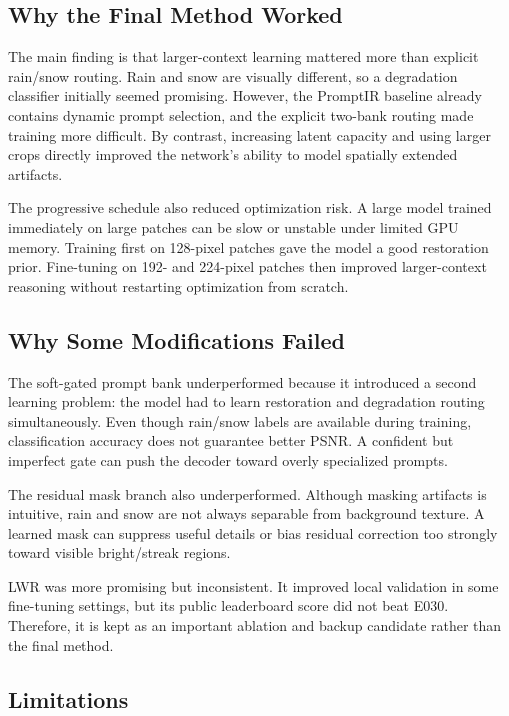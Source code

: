 \documentclass[10pt,conference]{article}
\begin{document}
\subsection{Why the Final Method Worked}

The main finding is that larger-context learning mattered more than explicit rain/snow routing. Rain and snow are visually different, so a degradation classifier initially seemed promising. However, the PromptIR baseline already contains dynamic prompt selection, and the explicit two-bank routing made training more difficult. By contrast, increasing latent capacity and using larger crops directly improved the network's ability to model spatially extended artifacts.

The progressive schedule also reduced optimization risk. A large model trained immediately on large patches can be slow or unstable under limited GPU memory. Training first on 128-pixel patches gave the model a good restoration prior. Fine-tuning on 192- and 224-pixel patches then improved larger-context reasoning without restarting optimization from scratch.

\subsection{Why Some Modifications Failed}

The soft-gated prompt bank underperformed because it introduced a second learning problem: the model had to learn restoration and degradation routing simultaneously. Even though rain/snow labels are available during training, classification accuracy does not guarantee better PSNR. A confident but imperfect gate can push the decoder toward overly specialized prompts.

The residual mask branch also underperformed. Although masking artifacts is intuitive, rain and snow are not always separable from background texture. A learned mask can suppress useful details or bias residual correction too strongly toward visible bright/streak regions.

LWR was more promising but inconsistent. It improved local validation in some fine-tuning settings, but its public leaderboard score did not beat E030. Therefore, it is kept as an important ablation and backup candidate rather than the final method.

\subsection{Limitations}
\end{document}
